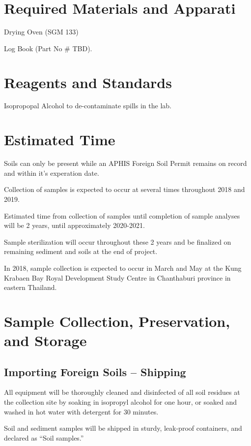 \documentclass[12pt]{../SOP3}\usepackage[]{graphicx}\usepackage[]{color}
\begin{document}
\section{Required Materials and Apparati}

\NP Drying Oven (SGM 133)

\NP Log Book (Part No \# TBD).

\section{Reagents and Standards}

\NP Isopropopal Alcohol to de-contaminate spills in the lab.

\section{Estimated Time}

\NP Soils can only be present while an APHIS Foreign Soil Permit remains on record and within it's experation date.

\NP Collection of samples is expected to occur at several times throughout 2018 and 2019. 

\NP Estimated time from collection of samples until completion of sample analyses will be 2 years, until approximately 2020-2021. 

\NP Sample sterilization will occur throughout these 2 years and be finalized on remaining sediment and soils at the end of project. 

\NP In 2018, sample collection is expected to occur in March and May at the Kung Krabaen Bay Royal Development Study Centre in Chanthaburi province in eastern Thailand.

\section{Sample Collection, Preservation, and Storage}

\subsection{Importing Foreign Soils -- Shipping}

\NP All equipment will be thoroughly cleaned and disinfected of all soil residues at the collection site by soaking in isopropyl alcohol for one hour, or soaked and washed in hot water with detergent for 30 minutes. 

\NP Soil and sediment samples will be shipped in sturdy, leak-proof containers, and declared as ``Soil samples.'' 
\end{document}

